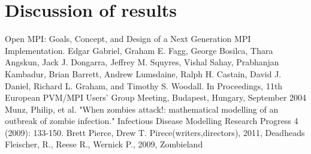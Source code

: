 \documentclass{report}
\begin{document}
\section{Discussion of results}
\begin{thebibliography}{99}
Open MPI: Goals, Concept, and Design of a Next Generation MPI Implementation. Edgar Gabriel, Graham E. Fagg, George Bosilca, Thara Angskun, Jack J. Dongarra, Jeffrey M. Squyres, Vishal Sahay, Prabhanjan Kambadur, Brian Barrett, Andrew Lumsdaine, Ralph H. Castain, David J. Daniel, Richard L. Graham, and Timothy S. Woodall. In Proceedings, 11th European PVM/MPI Users' Group Meeting, Budapest, Hungary, September 2004
Munz, Philip, et al. "When zombies attack!: mathematical modelling of an outbreak of zombie infection." Infectious Disease Modelling Research Progress 4 (2009): 133-150.
Brett Pierce, Drew T. Pirece(writers,directors), 2011, Deadheads
Fleischer, R., Reese R., Wernick P., 2009, Zombieland 
\end{thebibliography}
\end{document}
